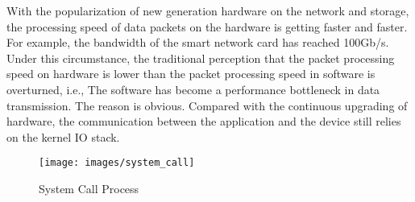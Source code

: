 










With the popularization of new generation hardware on the network and storage, the processing speed 
of data packets on the hardware is getting faster and faster\cite{12}. For example, 
the bandwidth of the smart
network card has reached 100Gb/s. Under this circumstance, the traditional perception
 that the packet processing speed on hardware is lower than the packet processing speed in 
 software is overturned\cite{Ousterhout1990WhyAO}, i.e.,
The software has become a performance bottleneck in data transmission.
The reason is obvious. Compared with the continuous upgrading of hardware, 
the communication between the application and the device still relies 
on the kernel IO stack. 

\begin{figure}[H]
  \centering
  \texttt{[image: images/system\_call]}
  \caption[System Call Process]{System Call Process}
  \label{fig:system_call_process}
\end{figure}
 
